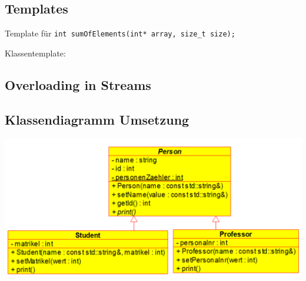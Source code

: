 \subsection{Templates}\label{Templates}
    Template für \verb|int sumOfElements(int* array, size_t size);|
    

    Klassentemplate:
    
    
    
    \nextcol
    
\subsection{Overloading in Streams}
    


\subsection{Klassendiagramm Umsetzung}
    \begin{center}
        \includegraphics[width=\columnwidth]{pictures/Klassendiagramm-Umsetzung.png}
    \end{center}

    

    \nextcol